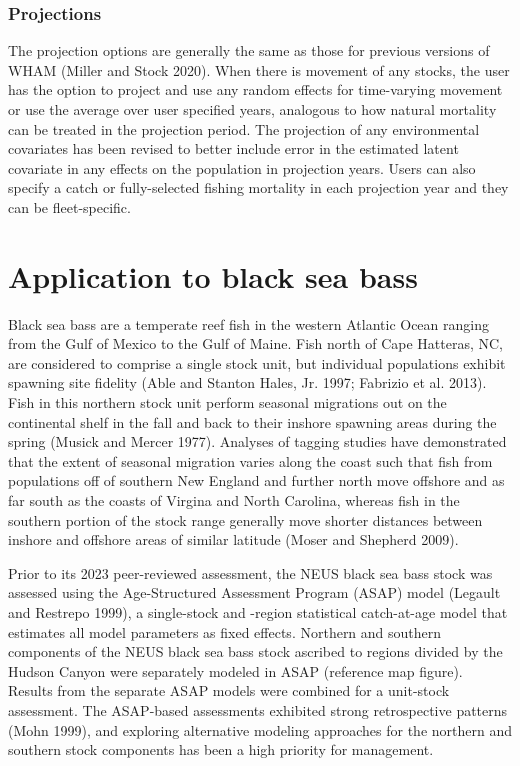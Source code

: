\documentclass[
]{article}
\begin{document}
\hypertarget{projections}{%
\subsubsection*{Projections}\label{projections}}

The projection options are generally the same as those for previous
versions of WHAM (Miller and Stock 2020). When there is movement of any
stocks, the user has the option to project and use any random effects
for time-varying movement or use the average over user specified years,
analogous to how natural mortality can be treated in the projection
period. The projection of any environmental covariates has been revised
to better include error in the estimated latent covariate in any effects
on the population in projection years. Users can also specify a catch or
fully-selected fishing mortality in each projection year and they can be
fleet-specific.

\hypertarget{application-to-black-sea-bass}{%
\section*{Application to black sea
bass}\label{application-to-black-sea-bass}}

Black sea bass are a temperate reef fish in the western Atlantic Ocean
ranging from the Gulf of Mexico to the Gulf of Maine. Fish north of Cape
Hatteras, NC, are considered to comprise a single stock unit, but
individual populations exhibit spawning site fidelity (Able and Stanton
Hales, Jr. 1997; Fabrizio et al. 2013). Fish in this northern stock unit
perform seasonal migrations out on the continental shelf in the fall and
back to their inshore spawning areas during the spring (Musick and
Mercer 1977). Analyses of tagging studies have demonstrated that the
extent of seasonal migration varies along the coast such that fish from
populations off of southern New England and further north move offshore
and as far south as the coasts of Virgina and North Carolina, whereas
fish in the southern portion of the stock range generally move shorter
distances between inshore and offshore areas of similar latitude (Moser
and Shepherd 2009).

Prior to its 2023 peer-reviewed assessment, the NEUS black sea bass
stock was assessed using the Age-Structured Assessment Program (ASAP)
model (Legault and Restrepo 1999), a single-stock and -region
statistical catch-at-age model that estimates all model parameters as
fixed effects. Northern and southern components of the NEUS black sea
bass stock ascribed to regions divided by the Hudson Canyon were
separately modeled in ASAP (reference map figure). Results from the
separate ASAP models were combined for a unit-stock assessment. The
ASAP-based assessments exhibited strong retrospective patterns (Mohn
1999), and exploring alternative modeling approaches for the northern
and southern stock components has been a high priority for management.
\end{document}

